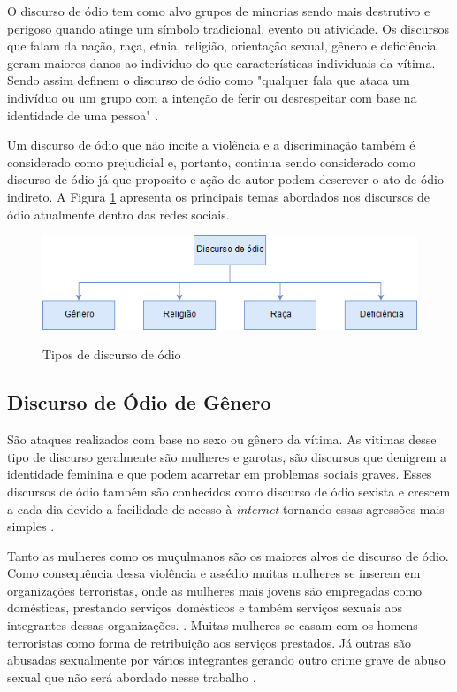 O discurso de ódio tem como alvo grupos de minorias sendo mais destrutivo e perigoso quando atinge um símbolo tradicional, evento ou atividade. Os discursos que falam da nação, raça, etnia, religião, orientação sexual, gênero e deficiência geram maiores danos ao indivíduo do que características individuais da vítima. Sendo assim  definem o discurso de ódio como "qualquer fala que ataca um indivíduo ou um grupo com a intenção de ferir ou desrespeitar com base na identidade de uma pessoa" \cite{Chetty2018}.

Um discurso de ódio que não incite a violência e a discriminação também é considerado como prejudicial e, portanto, continua sendo considerado como discurso de ódio já que proposito e ação do autor podem descrever o ato de ódio indireto. A Figura \ref{fig:tiposdediscursodeodio} apresenta os principais temas abordados nos discursos de ódio atualmente dentro das redes sociais.

\begin{figure}[!h]
\centering 
\caption{Tipos de discurso de ódio}
\includegraphics[scale=0.70]{imagens/tiposdediscursodeodio.png}
\label{fig:tiposdediscursodeodio}
\end{figure}

\subsection{Discurso de Ódio de Gênero}
São ataques realizados com base no sexo ou gênero da vítima. As vitimas desse tipo de discurso geralmente são mulheres e garotas, são discursos que denigrem a identidade feminina e que podem acarretar em problemas sociais graves. Esses discursos de ódio também são conhecidos como discurso de ódio sexista e crescem a cada dia devido a facilidade de acesso à \textit{internet} tornando essas agressões mais simples \cite{Chetty2018}.

Tanto as mulheres como os muçulmanos são os maiores alvos de discurso de ódio. Como consequência dessa violência e assédio muitas mulheres se inserem em organizações terroristas, onde as mulheres mais jovens são empregadas como domésticas, prestando serviços domésticos e também serviços sexuais aos integrantes dessas organizações. \cite{Edwards2016}. Muitas mulheres se casam com os homens terroristas como forma de retribuição aos serviços prestados. Já outras são abusadas sexualmente por vários integrantes gerando outro crime grave de abuso sexual que não será abordado nesse trabalho \cite{Edwards2016}.

